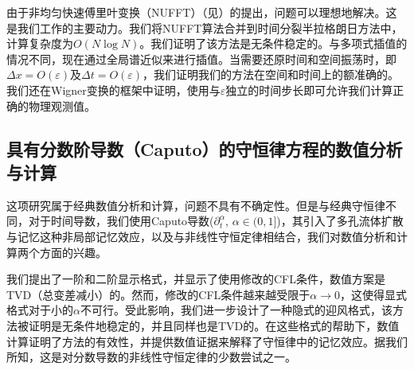 由于非均匀快速傅里叶变换（NUFFT）（见）的提出，问题可以理想地解决。这是我们工作的主要动力。我们将NUFFT算法合并到时间分裂半拉格朗日方法中，计算复杂度为$O(N\log N)$。我们证明了该方法是无条件稳定的。与多项式插值的情况不同，现在通过全局谱近似来进行插值。当需要还原时间和空间振荡时，即$\Delta x = O(\varepsilon)$及$\Delta t = O(\varepsilon)$，我们证明我们的方法在空间和时间上的额准确的。我们还在Wigner变换的框架中证明，使用与$\varepsilon $独立的时间步长即可允许我们计算正确的物理观测值。

\subsection{具有分数阶导数（Caputo）的守恒律方程的数值分析与计算}

这项研究属于经典数值分析和计算，问题不具有不确定性。但是与经典守恒律不同，对于时间导数，我们使用Caputo导数($\partial_t^\alpha$, $\alpha\in (0,1]$)，其引入了多孔流体扩散与记忆这种非局部记忆效应，以及与非线性守恒定律相结合，我们对数值分析和计算两个方面的兴趣。

我们提出了一阶和二阶显示格式，并显示了使用修改的CFL条件，数值方案是TVD（总变差减小）的。然而，修改的CFL条件越来越受限于$\alpha\rightarrow 0$，这使得显式格式对于小的$\alpha$不可行。受此影响，我们进一步设计了一种隐式的迎风格式，该方法被证明是无条件地稳定的，并且同样也是TVD的。在这些格式的帮助下，数值计算证明了方法的有效性，并提供数值证据来解释了守恒律中的记忆效应。据我们所知，这是对分数导数的非线性守恒定律的少数尝试之一。





